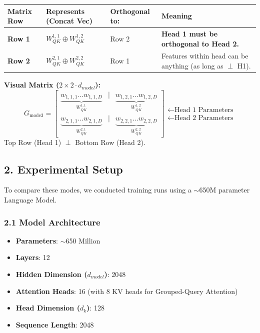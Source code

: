 \documentclass[12pt]{article}
\begin{document}
\begin{table}[h]
\centering
\color{lighttext}
\begin{tabularx}{\textwidth}{l l l X}
\toprule
Matrix Row & Represents (Concat Vec) & Orthogonal to: & Meaning \\
\midrule
\textbf{Row 1} & $W_{QK}^{1,1} \oplus W_{QK}^{1,2}$ & Row 2 & \textbf{Head 1 must be orthogonal to Head 2.} \\
\textbf{Row 2} & $W_{QK}^{2,1} \oplus W_{QK}^{2,2}$ & Row 1 & Features within head can be anything (as long as $\perp$ H1). \\
\bottomrule
\end{tabularx}
\end{table}

\textbf{Visual Matrix ($2 \times 2 \cdot d_{model}$):}
$$
G_{\text{mode3}} = 
\begin{bmatrix}
\underbrace{w_{1,1,1} \dots w_{1,1,D}}_{W_{QK}^{1,1}} & \mathbf{|} & \underbrace{w_{1,2,1} \dots w_{1,2,D}}_{W_{QK}^{1,2}} \\
\underbrace{w_{2,1,1} \dots w_{2,1,D}}_{W_{QK}^{2,1}} & \mathbf{|} & \underbrace{w_{2,2,1} \dots w_{2,2,D}}_{W_{QK}^{2,2}}
\end{bmatrix}
\begin{matrix}
\leftarrow \text{Head 1 Parameters} \\
\leftarrow \text{Head 2 Parameters}
\end{matrix}
$$
Top Row (Head 1) $\perp$ Bottom Row (Head 2).

\vspace{1em}

\subsection*{2. Experimental Setup}

To compare these modes, we conducted training runs using a $\sim$650M parameter Language Model.

\subsubsection*{2.1 Model Architecture}
\begin{itemize}
    \item \textbf{Parameters}: $\sim$650 Million
    \item \textbf{Layers}: 12
    \item \textbf{Hidden Dimension ($d_{model}$)}: 2048
    \item \textbf{Attention Heads}: 16 (with 8 KV heads for Grouped-Query Attention)
    \item \textbf{Head Dimension ($d_k$)}: 128
    \item \textbf{Sequence Length}: 2048
\end{itemize}
\end{document}

